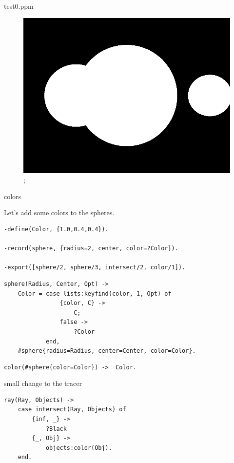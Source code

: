 \begin{frame}{test0.ppm}

\begin{figure}
\includegraphics[scale=0.3]{test0.png};
\end{figure}

\end{frame}


\begin{frame}[fragile]{colors}

\pause Let's add some colors to the spheres.

\begin{verbatim}
-define(Color, {1.0,0.4,0.4}).

-record(sphere, {radius=2, center, color=?Color}).

-export([sphere/2, sphere/3, intersect/2, color/1]).
\end{verbatim}
\pause
\begin{verbatim}
sphere(Radius, Center, Opt) ->
    Color = case lists:keyfind(color, 1, Opt) of
                {color, C} ->
                    C;
                false ->
                    ?Color
            end,
    #sphere{radius=Radius, center=Center, color=Color}.
\end{verbatim}

\pause
\begin{verbatim}
color(#sphere{color=Color}) ->  Color.
\end{verbatim}

\end{frame}

\begin{frame}[fragile]{small change to the tracer}

\pause
\begin{verbatim}
ray(Ray, Objects) ->
    case intersect(Ray, Objects) of
        {inf, _} ->
            ?Black
        {_, Obj} -> 
            objects:color(Obj).
    end.
\end{verbatim}
\end{frame}


